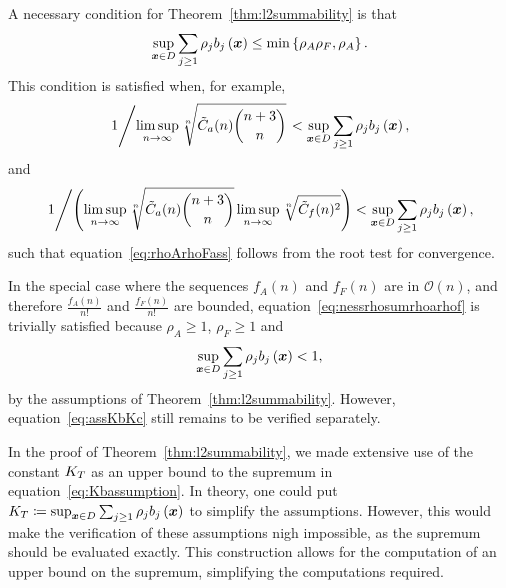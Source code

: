 \begin{remark}\label{rem:Kbinterval}
A necessary condition for Theorem~\ref{thm:l2summability} is that
\begin{equation}
	\sup_{{{\bm{x}}}\in D}\sum_{j \geq 1} \rho_j b_j\left({{\bm{x}}} \right) \leq \min\left\{ \rho_A \rho_F, \rho_A \right\}.\label{eq:nessrhosumrhoarhof}
\end{equation}
This condition is satisfied when, for example,
\begin{equation*}
	\left.1\middle/\limsup_{n\to\infty} \sqrt[n]{{\tilde{C}_a}(n)\binom{n+3}{n}} \right.< \sup_{{{\bm{x}}}\in D}\sum_{j \geq 1} \rho_j b_j\left({{\bm{x}}} \right),
\end{equation*}
and
\begin{equation*}
	\left.1\middle/\middle(\limsup_{n\to\infty} \sqrt[n]{{\tilde{C}_a}(n)\binom{n+3}{n}} \limsup_{n\to\infty} \sqrt[n]{{\tilde{C}_f}(n)^2}\right) < \sup_{{{\bm{x}}}\in D}\sum_{j \geq 1} \rho_j b_j\left({{\bm{x}}} \right),
\end{equation*}
such that equation~\eqref{eq:rhoArhoFass} follows from the root test for convergence.

In the special case where the sequences $f_A(n)$ and $f_F(n)$ are in $\mathcal{O}(n)$, and therefore $\frac{f_A(n)}{n!}$ and $\frac{f_F(n)}{n!}$ are bounded, equation~\eqref{eq:nessrhosumrhoarhof} is trivially satisfied because $\rho_A\geq 1$, $\rho_F\geq 1$ and
\begin{equation*}
	\sup_{{{\bm{x}}}\in D}\sum_{j \geq 1} \rho_j b_j\left({{\bm{x}}} \right)<1,
\end{equation*}
by the assumptions of Theorem~\ref{thm:l2summability}.
However, equation~\eqref{eq:assKbKc} still remains to be verified separately.
\end{remark}

\begin{remark}
	In the proof of Theorem~\ref{thm:l2summability}, we made extensive use of the constant $K_T$ as an upper bound to the supremum in equation~\eqref{eq:Kbassumption}.
	In theory, one could put $K_T\coloneqq\sup_{{{\bm{x}}}\in D}\sum_{j \geq 1} \rho_j b_j\left({{\bm{x}}} \right)$ to simplify the assumptions.
	However, this would make the verification of these assumptions nigh impossible, as the supremum should be evaluated exactly.
	This construction allows for the computation of an upper bound on the supremum, simplifying the computations required.
\end{remark}

